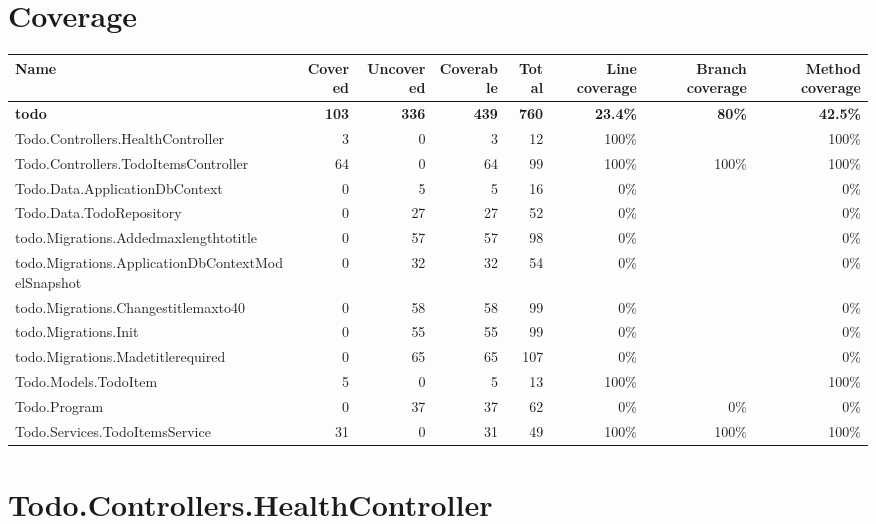 \documentclass[a4paper,landscape,10pt]{article}
\begin{document}
\section{Coverage}
\begin{longtable}[l]{|l|r|r|r|r|r|r|r|}
\hline
\textbf{Name} & \textbf{Covered} & \textbf{Uncovered} & \textbf{Coverable} & \textbf{Total} & \textbf{Line coverage} & \textbf{Branch coverage} & \textbf{Method coverage}\\
\hline
\textbf{todo} & \textbf{103} & \textbf{336} & \textbf{439} & \textbf{760} & \textbf{23.4\%} & \textbf{80\%} & \textbf{42.5\%}\\
\hline
Todo.Controllers.HealthController & 3 & 0 & 3 & 12 & 100\% &  & 100\%\\
\hline
Todo.Controllers.TodoItemsController & 64 & 0 & 64 & 99 & 100\% & 100\% & 100\%\\
\hline
Todo.Data.ApplicationDbContext & 0 & 5 & 5 & 16 & 0\% &  & 0\%\\
\hline
Todo.Data.TodoRepository & 0 & 27 & 27 & 52 & 0\% &  & 0\%\\
\hline
todo.Migrations.Addedmaxlengthtotitle & 0 & 57 & 57 & 98 & 0\% &  & 0\%\\
\hline
todo.Migrations.ApplicationDbContextModelSnapshot & 0 & 32 & 32 & 54 & 0\% &  & 0\%\\
\hline
todo.Migrations.Changestitlemaxto40 & 0 & 58 & 58 & 99 & 0\% &  & 0\%\\
\hline
todo.Migrations.Init & 0 & 55 & 55 & 99 & 0\% &  & 0\%\\
\hline
todo.Migrations.Madetitlerequired & 0 & 65 & 65 & 107 & 0\% &  & 0\%\\
\hline
Todo.Models.TodoItem & 5 & 0 & 5 & 13 & 100\% &  & 100\%\\
\hline
Todo.Program & 0 & 37 & 37 & 62 & 0\% & 0\% & 0\%\\
\hline
Todo.Services.TodoItemsService & 31 & 0 & 31 & 49 & 100\% & 100\% & 100\%\\
\hline
\end{longtable}
\newpage
\section{Todo.Controllers.HealthController}
\end{document}
